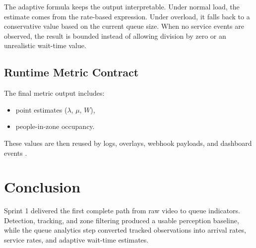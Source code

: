 The adaptive formula keeps the output interpretable. Under normal load, the estimate comes from the rate-based expression. Under overload, it falls back to a conservative value based on the current queue size. When no service events are observed, the result is bounded instead of allowing division by zero or an unrealistic wait-time value.

\subsection{Runtime Metric Contract}
The final metric output includes:
\begin{itemize}
    \item point estimates ($\lambda$, $\mu$, $W$),
    \item people-in-zone occupancy.
\end{itemize}
These values are then reused by logs, overlays, webhook payloads, and dashboard events \cite{opencv_docs,gross_queueing}.

\section{Conclusion}
Sprint 1 delivered the first complete path from raw video to queue indicators. Detection, tracking, and zone filtering produced a usable perception baseline, while the queue analytics step converted tracked observations into arrival rates, service rates, and adaptive wait-time estimates.

